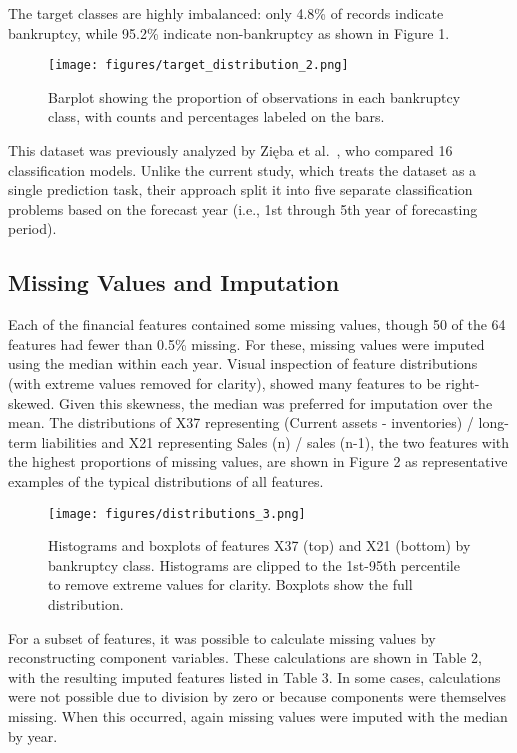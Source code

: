 \documentclass{article}      %
\begin{document}
The target classes are highly imbalanced: only 4.8\% of records indicate bankruptcy, while 95.2\% indicate non-bankruptcy as shown in Figure 1.

\begin{figure}[!h]
	\centering
	\texttt{[image: figures/target\_distribution\_2.png]}
	\caption{Barplot showing the proportion of observations in each bankruptcy class, with counts and percentages labeled on the bars.}
	\label{fig:target_distribution}
\end{figure}

This dataset was previously analyzed by Zi\k{e}ba et al.~\cite{zieba2016}, who compared 16 classification models. Unlike the current study, which treats the dataset as a single prediction task, their approach split it into five separate classification problems based on the forecast year (i.e., 1st through 5th year of forecasting period).

\subsection{Missing Values and Imputation}

Each of the financial features contained some missing values, though 50 of the 64 features had fewer than 0.5\% missing. For these, missing values were imputed using the median within each year. Visual inspection of feature distributions (with extreme values removed for clarity), showed many features to be right-skewed. Given this skewness, the median was preferred for imputation over the mean. The distributions of X37 representing (Current assets - inventories) / long-term liabilities and X21 representing Sales (n) / sales (n-1), the two features with the highest proportions of missing values, are shown in Figure 2 as representative examples of the typical distributions of all features.

\begin{figure}[!h]
	\centering
	\texttt{[image: figures/distributions\_3.png]}
	\caption{Histograms and boxplots of features X37 (top) and X21 (bottom) by bankruptcy class. Histograms are clipped to the 1st-95th percentile to remove extreme values for clarity. Boxplots show the full distribution.}
	\label{fig:distributions}
\end{figure}

For a subset of features, it was possible to calculate missing values by reconstructing component variables. These calculations are shown in Table 2, with the resulting imputed features listed in Table 3. In some cases, calculations were not possible due to division by zero or because components were themselves missing. When this occurred, again missing values were imputed with the median by year.
\end{document}

